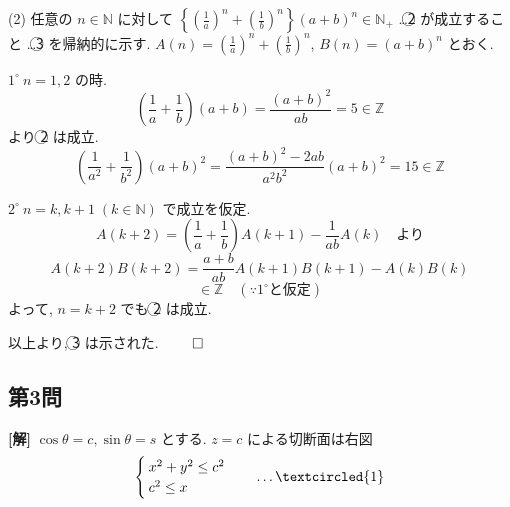 \documentclass[../main.tex]{subfiles}
\begin{document}
\bigskip

\noindent
(2) 任意の $n \in \mathbb{N}$ に対して $\left\{ \left(\frac{1}{a}\right)^n + \left(\frac{1}{b}\right)^n \right\} (a+b)^n \in \mathbb{N}_+$ \dots \textcircled{2} が成立すること \dots \textcircled{3} を帰納的に示す. $A(n) = \left(\frac{1}{a}\right)^n + \left(\frac{1}{b}\right)^n$, $B(n) = (a+b)^n$ とおく.

\medskip

\noindent
$1^\circ \ n = 1, 2$ の時.
\[
  \left(\frac{1}{a} + \frac{1}{b}\right)(a+b) = \frac{(a+b)^2}{ab} = 5 \in \mathbb{Z}
\]
より \textcircled{2} は成立.
\[
  \left(\frac{1}{a^2} + \frac{1}{b^2}\right)(a+b)^2 = \frac{(a+b)^2 - 2ab}{a^2 b^2} (a+b)^2 = 15 \in \mathbb{Z}
\]

\medskip

\noindent
$2^\circ \ n = k, k+1 \; (k \in \mathbb{N})$ で成立を仮定.
\[
  A(k+2) = \left(\frac{1}{a} + \frac{1}{b}\right) A(k+1) - \frac{1}{ab} A(k) \quad \text{より}
\]
\[
  A(k+2) B(k+2) = \frac{a+b}{ab} A(k+1) B(k+1) - A(k) B(k)
\]
\[
  \in \mathbb{Z} \quad (\because 1^\circ \text{と仮定})
\]
よって, $n = k+2$ でも \textcircled{2} は成立.

\medskip

\noindent
以上より, \textcircled{3} は示された. \hfill $\qed$

\newpage

\subsection*{第3問}

\noindent
\textbf{[解]} $\cos\theta = c, \sin\theta = s$ とする. $z = c$ による切断面は右図
\[
  \begin{cases}
    x^2 + y^2 \le c^2 \\
    c^2 \le x
  \end{cases} \quad \dots \textcircled{1}
\]

\begin{center}
\end{center}
\end{document}
